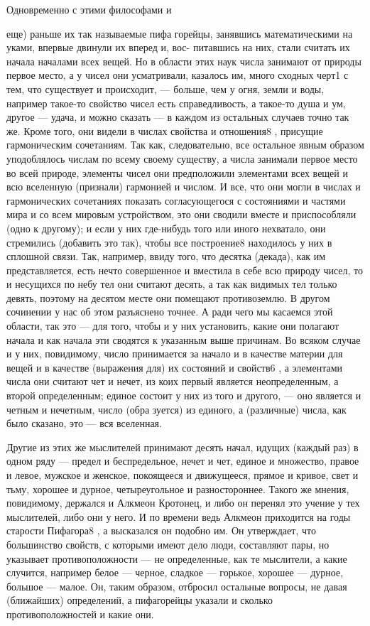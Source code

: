 \documentclass{article}
\begin{document}
Одновременно с этими философами и {еще) раньше их так называемые пифа горейцы, занявшись математическими на уками, впервые двинули их вперед и, вос- питавшись на них, стали считать их начала  началами всех вещей. Но в области этих  наук числа занимают от природы первое место, а у чисел они усматривали, казалось им, много сходных черт1  с тем, что существует и происходит, --- больше, чем у огня, земли и воды, например такое-то свойство чисел есть справедливость, а такое-то душа и ум, другое --- удача, и можно сказать --- в каждом из остальных случаев точно так же. Кроме того, они видели в числах свойства и отношения8 , присущие гармоническим сочетаниям. Так как, следовательно, все остальное явным образом уподоблялось числам по всему своему существу, а числа занимали первое место во всей природе, элементы чисел они предположили элементами всех вещей и всю вселенную (признали) гармонией и числом. И все, что они могли в числах и гармонических сочетаниях показать согласующегося с состояниями и частями мира и со всем мировым устройством, это они сводили вместе и приспособляли (одно к другому); и если у них где-нибудь того или иного нехватало, они стремились (добавить это так), чтобы все построение8  находилось у них в сплошной связи. Так, например, ввиду того, что десятка (декада), как им представляется, есть нечто совершенное и вместила в себе всю природу чисел, то и несущихся по небу тел они считают десять, а так как видимых тел только девять, поэтому на десятом месте они помещают противоземлю.
\footnotemark[1]
В другом сочинении у нас об этом разъяснено точнее.
\footnotemark[2]
А ради чего мы касаемся этой области, так это --- для того, чтобы и у них установить, какие они полагают начала и как начала эти сводятся к указанным выше причинам. Во всяком случае и у них, повидимому, число принимается за начало и в качестве материи для вещей и в качестве (выражения для) их состояний и свойств6 , а элементами числа они считают чет и нечет, из коих первый является неопределенным, а второй определенным; единое состоит у них из того и другого, --- оно является и четным и нечетным, число (обра зуется) из единого, а (различные) числа, как было сказано, это --- вся вселенная.

Другие из этих же мыслителей принимают десять начал, идущих (каждый раз) в одном ряду --- предел и беспредельное, нечет и чет, единое и множество, правое и левое, мужское и женское, покоящееся и движущееся, прямое и кривое, свет и тьму, хорошее и дурное, четыреугольное и разностороннее.
\footnotemark[3]
Такого же мнения, повидимому, держался и Алкмеон Кротонец,
\footnotemark[4]
и либо он перенял это учение у тех мыслителей, либо они у него. И по времени ведь Алкмеон приходится на годы старости Пифагора8 , а высказался он подобно им. Он утверждает, что большинство свойств, с которыми имеют дело люди, составляют пары, но указывает противоположности --- не определенные, как те мыслители, а какие случится, например белое --- черное, сладкое --- горькое, хорошее --- дурное, большое --- малое. Он, таким образом, отбросил остальные вопросы, не давая (ближайших) определений, а пифагорейцы указали и сколько противоположностей и какие они.

}
\end{document}
